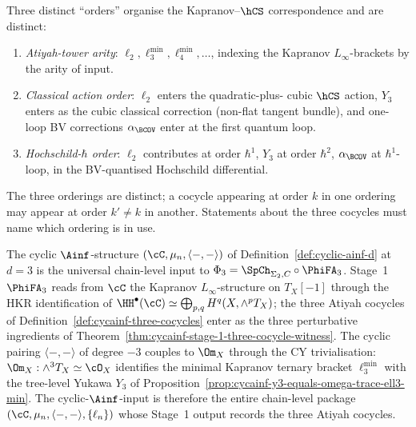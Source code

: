 \begin{remark}
\label{rem:cycainf-three-orders}
Three distinct ``orders'' organise the Kapranov--$\hCS$ correspondence
and are distinct:
\begin{enumerate}
\item \emph{Atiyah-tower arity}: $\ell_2, \ell_3^{\min}, \ell_4^{\min},
\ldots$, indexing the Kapranov $L_\infty$-brackets by the arity of
input.
\item \emph{Classical action order}: $\ell_2$ enters the quadratic-plus-
cubic $\hCS$ action, $Y_3$ enters as the cubic classical correction
(non-flat tangent bundle), and one-loop BV corrections $\alpha_{\BCOV}$
enter at the first quantum loop.
\item \emph{Hochschild-$\hbar$ order}: $\ell_2$ contributes at order
$\hbar^1$, $Y_3$ at order $\hbar^2$, $\alpha_{\BCOV}$ at $\hbar^1$-loop,
in the BV-quantised Hochschild differential.
\end{enumerate}
The three orderings are distinct; a cocycle appearing at order $k$ in
one ordering may appear at order $k' \neq k$ in another. Statements
about the three cocycles must name which ordering is in use.
\end{remark}

\begin{remark}
\label{rem:cycainf-absorbs-three-cocycles}
The cyclic $\Ainf$-structure $(\cC, \mu_n, \langle-,-\rangle)$ of
Definition~\ref{def:cyclic-ainf-d} at $d = 3$ is the universal
chain-level input to $\Phi_3 = \SpCh_{\Sigma_2, C} \circ \PhiFA_3$.
Stage~1 $\PhiFA_3$ reads from $\cC$ the Kapranov $L_\infty$-structure
on $T_X[-1]$ through the HKR identification of
$\HH^\bullet(\cC) \simeq \bigoplus_{p,q} H^q(X, \wedge^p T_X)$; the
three Atiyah cocycles of
Definition~\ref{def:cycainf-three-cocycles} enter as the three
perturbative ingredients of Theorem~\ref{thm:cycainf-stage-1-three-cocycle-witness}.
The cyclic pairing $\langle-,-\rangle$ of degree $-3$ couples to
$\Om_X$ through the CY trivialisation: $\Om_X: \wedge^3 T_X
\simeq \cO_X$ identifies the minimal Kapranov ternary bracket $\ell_3^{\min}$
with the tree-level Yukawa $Y_3$ of Proposition~\ref{prop:cycainf-y3-equals-omega-trace-ell3-min}.
The cyclic-$\Ainf$-input is therefore the
entire chain-level package $(\cC, \mu_n, \langle-,-\rangle, \{\ell_n\})$
whose Stage~1 output records the three Atiyah cocycles.
\end{remark}

